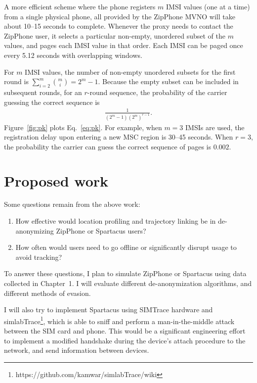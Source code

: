 A more efficient scheme where the phone registers $m$ IMSI values (one at a time)
from a single physical phone, all provided by the ZipPhone MVNO will take about 10--15 seconds to complete. Whenever the
proxy needs to contact the ZipPhone user, it selects a particular
non-empty, unordered subset of the $m$ values, and pages each IMSI
value in that order. Each IMSI can be paged once every 5.12 seconds with overlapping windows. 

For $m$ IMSI values, the number of non-empty unordered subsets for the first round is
$\sum_{i=2}^m{\binom{m}{i}}= 2^m-1.$ Because the empty subset can be included in subsequent rounds, 
for an 
$r$-round  sequence, the probability of the carrier guessing the
correct sequence  is
\begin{eqnarray}
\frac{1}{(2^m-1)(2^m)^{r-1}}. \label{eq:pk}
\end{eqnarray}
Figure~\ref{fig:pk} plots Eq.~\ref{eq:pk}. For example, when $m=3$ IMSIs are
used, the registration delay upon entering a new MSC region is 30--45
seconds. When $r=3$, the probability the carrier can guess the correct
sequence of pages is $0.002$. 

\section{Proposed work}

Some questions remain from the above work:
\begin{enumerate}
	\item How effective would location profiling and trajectory linking be in de-anonymizing ZipPhone or Spartacus users?
	\item How often would users need to go offline or significantly disrupt usage to avoid tracking?
\end{enumerate}

To answer these questions, I plan to simulate ZipPhone or Spartacus using data collected in Chapter~1. I will evaluate different de-anonymization algorithms, and different methods of evasion.

I will also try to implement Spartacus using SIMTrace hardware and simlabTrace\footnote{https://github.com/kamwar/simlabTrace/wiki}, which is able to sniff and perform a man-in-the-middle attack between the SIM card and phone. This would be a significant engineering effort to implement a modified handshake during the device's attach procedure to the network, and send information between devices.

